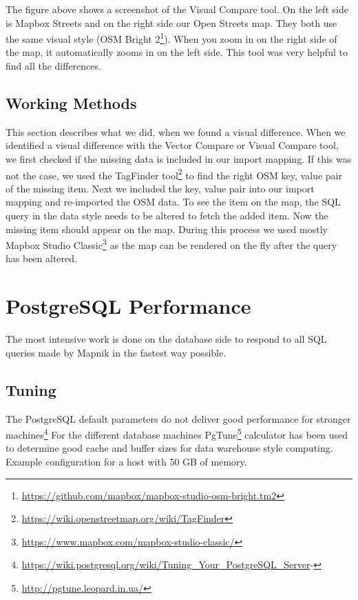 The figure above shows a screenshot of the Visual Compare tool. On the left side is Mapbox Streets and on the right side our Open Streets map. They both use the same visual style (OSM Bright 2\footnote{\url{https://github.com/mapbox/mapbox-studio-osm-bright.tm2}}). When you zoom in on the right side of the map, it automatically zooms in on the left side. This tool was very helpful to find all the differences.

\subsection{Working Methods}
This section describes what we did, when we found a visual difference. When we identified a visual difference with the Vector Compare or Visual Compare tool, we first checked if the missing data is included in our import mapping. If this was not the case, we used the TagFinder tool\footnote{\url{https://wiki.openstreetmap.org/wiki/TagFinder}} to find the right OSM key, value pair of the missing item. Next we included the key, value pair into our import mapping and re-imported the OSM data. To see the item on the map, the SQL query in the data style needs to be altered to fetch the added item. Now the missing item should appear on the map. During this process we used mostly Mapbox Studio Classic\footnote{\url{https://www.mapbox.com/mapbox-studio-classic/}} as the map can be rendered on the fly after the query has been altered.

\section{PostgreSQL Performance}
\label{postgres-performance}

The most intensive work is done on the database side to respond to all SQL queries made by Mapnik in the fastest way possible.

\subsection{Tuning}

The PostgreSQL default parameters do not deliver good performance for stronger machines\footnote{\url{https://wiki.postgresql.org/wiki/Tuning_Your_PostgreSQL_Server}-}
For the different database machines PgTune\footnote{\url{http://pgtune.leopard.in.ua/}} calculator has been used to determine good cache and buffer sizes for data warehouse style computing.
\\
Example configuration for a host with 50 GB of memory.

